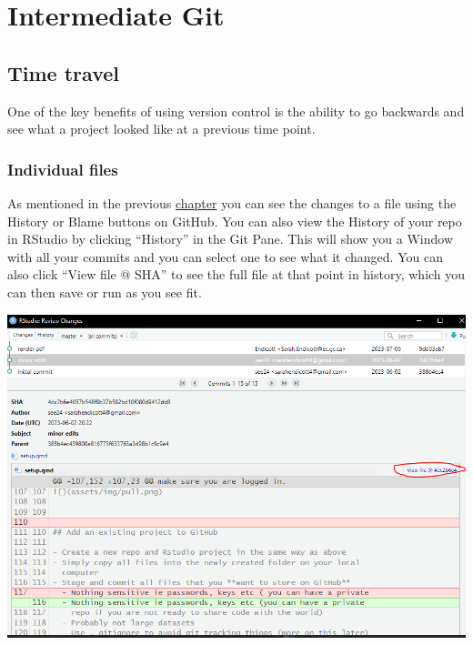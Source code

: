 \documentclass[
  letterpaper,
  DIV=11,
  numbers=noendperiod]{scrreprt}
\begin{document}

\hypertarget{intermediate-git}{%
\chapter{Intermediate Git}\label{intermediate-git}}

\hypertarget{time-travel}{%
\section{Time travel}\label{time-travel}}

One of the key benefits of using version control is the ability to go
backwards and see what a project looked like at a previous time point.

\hypertarget{individual-files}{%
\subsection{Individual files}\label{individual-files}}

As mentioned in the previous
\href{https://landscitech.github.io/Github_tutorial/git-basics.html\#file-on-github}{chapter}
you can see the changes to a file using the History or Blame buttons on
GitHub. You can also view the History of your repo in RStudio by
clicking ``History'' in the Git Pane. This will show you a Window with
all your commits and you can select one to see what it changed. You can
also click ``View file @ SHA'' to see the full file at that point in
history, which you can then save or run as you see fit.

\includegraphics{assets/img/RS_history.PNG}
\end{document}
